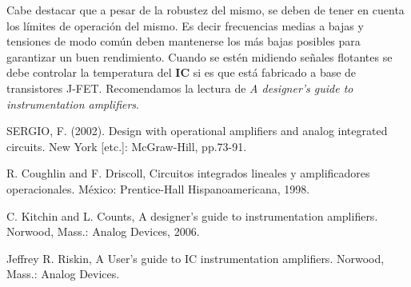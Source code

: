  Cabe destacar que a pesar de la robustez del mismo, se deben de tener en cuenta los límites de operación del mismo. Es decir frecuencias medias a bajas y tensiones de modo común deben mantenerse los más bajas posibles para garantizar un buen rendimiento.
Cuando se estén midiendo señales flotantes se debe controlar la temperatura del \textbf{IC} si es que está fabricado a base de transistores J-FET.
Recomendamos la lectura de \textit{A designer's guide to instrumentation amplifiers}.


 	
\begin{thebibliography}{9}
	
	SERGIO, F. (2002). Design with operational amplifiers and analog integrated circuits. New York [etc.]: McGraw-Hill, pp.73-91.	
	
	R. Coughlin and F. Driscoll, Circuitos integrados lineales y amplificadores operacionales. México: Prentice-Hall Hispanoamericana, 1998.
	
	C. Kitchin and L. Counts, A designer's guide to instrumentation amplifiers. Norwood, Mass.: Analog Devices, 2006.
	
	Jeffrey R. Riskin, A User's guide to IC instrumentation amplifiers. Norwood, Mass.: Analog Devices.
	
\end{thebibliography}
